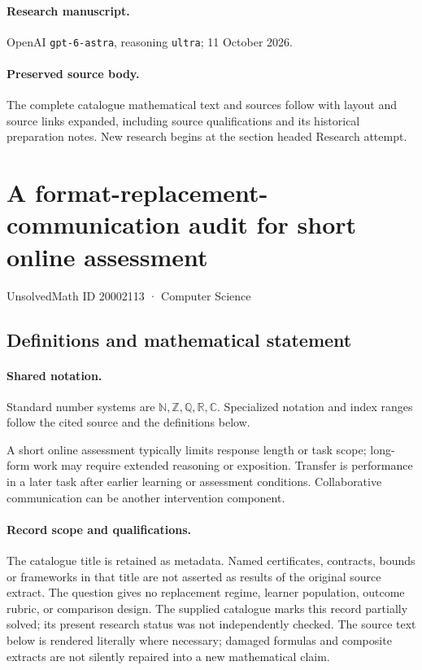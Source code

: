\documentclass[11pt]{article}
\begin{document}
\paragraph{Research manuscript.} OpenAI \texttt{gpt-6-astra}, reasoning \texttt{ultra}; 11 October 2026.
\paragraph{Preserved source body.} The complete catalogue mathematical text and sources follow with layout and source links expanded, including source qualifications and its historical preparation notes. New research begins at the section headed Research attempt.

\section{A format-replacement-communication audit for short online assessment}\label{20002113}
{\small UnsolvedMath ID 20002113 · Computer Science}
\subsection{Definitions and mathematical statement}

\paragraph{Shared notation.}Standard number systems are $\mathbb N,\mathbb Z,\mathbb Q,\mathbb R,\mathbb C$. Specialized notation and index ranges follow the cited source and the definitions below.


A short online assessment typically limits response length or task scope; long-form work may require extended reasoning or exposition. Transfer is performance in a later task after earlier learning or assessment conditions. Collaborative communication can be another intervention component.
\paragraph{Record scope and qualifications.}
The catalogue title is retained as metadata. Named certificates, contracts, bounds or frameworks in that title are not asserted as results of the original source extract.
The question gives no replacement regime, learner population, outcome rubric, or comparison design. The supplied catalogue marks this record partially solved; its present research status was not independently checked.
The source text below is rendered literally where necessary; damaged formulas and composite extracts are not silently repaired into a new mathematical claim.
\end{document}
